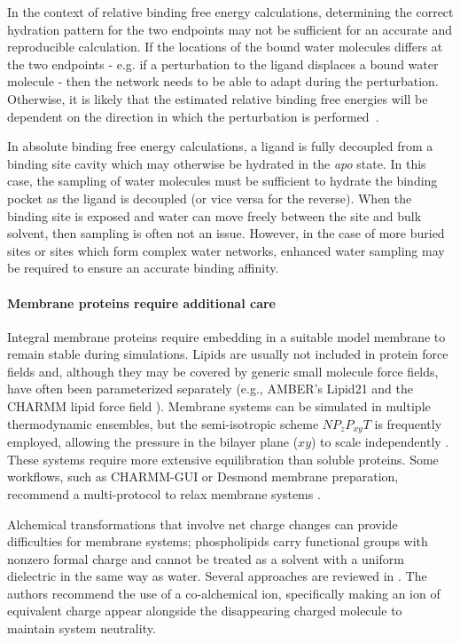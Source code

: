 \documentclass[9pt,bestpractices]{livecoms}
\begin{document}
In the context of relative binding free energy calculations, determining the correct hydration pattern for the two endpoints may not be sufficient for an accurate and reproducible calculation. If the locations of the bound water molecules differs at the two endpoints - e.g. if a perturbation to the ligand displaces a bound water molecule - then the network needs to be able to adapt during the perturbation. Otherwise, it is likely that the estimated relative binding free energies will be dependent on the direction in which the perturbation is performed~\cite{ross2020enhancing}.

In absolute binding free energy calculations, a ligand is fully decoupled from a binding site cavity which may otherwise be hydrated in the \textit{apo} state. In this case, the sampling of water molecules must be sufficient to hydrate the binding pocket as the ligand is decoupled (or vice versa for the reverse). When the binding site is exposed and water can move freely between the site and bulk solvent, then sampling is often not an issue. However, in the case of more buried sites or sites which form complex water networks, enhanced water sampling may be required to ensure an accurate binding affinity.

\paragraph{Membrane proteins require additional care}
Integral membrane proteins require embedding in a suitable model membrane to remain stable during simulations. Lipids are usually not included in protein force fields and, although they may be covered by generic small molecule force fields, have often been parameterized separately (e.g., AMBER's Lipid21 \cite{AMBERLipid21} and the CHARMM lipid force field \cite{CHARMMLipidFF}). Membrane systems can be simulated in multiple thermodynamic ensembles, but the semi-isotropic scheme $NP_{z}P_{xy}T$ is frequently employed, allowing the pressure in the bilayer plane ($xy$) to scale independently \cite{LipidBestPracticesCOMS}. These systems require more extensive equilibration than soluble proteins. Some workflows, such as CHARMM-GUI or Desmond membrane preparation, recommend a multi-protocol to relax membrane systems \cite{https://doi.org/10.1002/jcc.23702,DesmondManual}. 

Alchemical transformations that involve net charge changes can provide difficulties for membrane systems; phospholipids carry functional groups with nonzero formal charge and cannot be treated as a solvent with a uniform dielectric in the same way as water. Several approaches are reviewed in \cite{wu2022correction-51c}. The authors recommend the use of a co-alchemical ion, specifically making an ion of equivalent charge appear alongside the disappearing charged molecule to maintain system neutrality.
\end{document}
